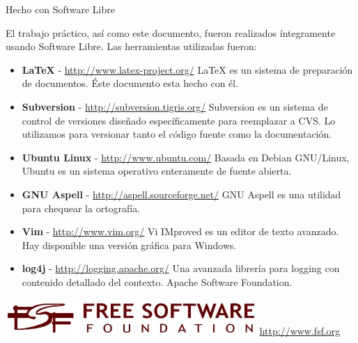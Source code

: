 %
% 
%

\thispagestyle{empty}

\begin{center}
\LARGE{Hecho con Software Libre}
\end{center}

\noindent

El trabajo práctico, así como este documento, fueron realizados íntegramente
usando Software Libre. Las herramientas utilizadas fueron:

\begin{flushleft}
\begin{itemize}

\item \textbf{\LaTeX} - \href{http://www.latex-project.org/}
  {http://www.latex-project.org/}
\linebreak\LaTeX{} es un sistema de preparación de documentos. Éste
  documento esta hecho con él.

\item \textbf{Subversion} - \href{http://subversion.tigris.org/}
  {http://subversion.tigris.org/}
\linebreak Subversion es un sistema de control de versiones diseñado
  específicamente para reemplazar a CVS. Lo utilizamos para versionar
  tanto el código fuente como la documentación.

\item \textbf{Ubuntu Linux} - \href{http://www.ubuntu.com/}
  {http://www.ubuntu.com/}
\linebreak Basada en Debian GNU/Linux, Ubuntu es un sistema operativo
enteramente de fuente abierta.

\item \textbf{GNU Aspell} - \href{http://aspell.sourceforge.net//}
  {http://aspell.sourceforge.net/}
\linebreak GNU Aspell es una utilidad para chequear la ortografía.

\item \textbf{Vim} - \href{http://www.vim.org/}
  {http://www.vim.org/}
\linebreak Vi IMproved es un editor de texto avanzado. Hay disponible una
versión gráfica para Windows.

\item \textbf{log4j} - \href{http://logging.apache.org/}
  {http://logging.apache.org/}
\linebreak Una avanzada librería para logging con contenido detallado 
del contexto. Apache Software Foundation.

\end{itemize}
\end{flushleft}

\begin{center}
\includegraphics[scale=0.50]{hechoconsl/logofsf.jpg}
\linebreak\href{http://www.fsf.org}{http://www.fsf.org}
\end{center}
